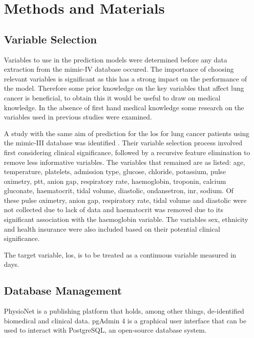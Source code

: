 \documentclass[11pt]{article}
\begin{document}
\newpage

\section{Methods and Materials}

\subsection{Variable Selection}
Variables to use in the prediction models were determined before any data extraction from the \gls{mimic}-IV database occured. The importance of choosing relevant variables is significant as this has a strong impact on the performance of the model. Therefore some prior knowledge on the key variables that affect lung cancer is beneficial, to obtain this it would be useful to draw on medical knowledge. In the absence of first hand medical knowledge some research on the variables used in previous studies were examined.  

A study with the same aim of prediction for the \gls{los} for lung cancer patients using the \gls{mimic}-III database was identified \cite{Alsinglawi123}. Their variable selection process involved first considering clinical significance, followed by a recursive feature elimination to remove less informative variables. The variables that remained are as listed: age, temperature, platelets, admission type, glucose, chloride, potassium, pulse oximetry, \gls{ptt}, anion gap, respiratory rate, haemoglobin, troponin, calcium gluconate, haematocrit, tidal volume, diastolic, ondansetron, \gls{inr}, sodium. Of these pulse oximetry, anion gap, respiratory rate, tidal volume and diastolic were not collected due to lack of data and haematocrit was removed due to its significant association with the haemoglobin variable. The variables sex, ethnicity and health insurance were also included based on their potential clinical significance. 

The target variable, \gls{los}, is to be treated as a continuous variable measured in days.

\subsection{Database Management}
PhysioNet\cite{PhysioNet} is a publishing platform that holds, among other things, de-identified biomedical and clinical data. pgAdmin 4 is a graphical user interface that can be used to interact with PostgreSQL, an open-source database system\cite{pgAdmin4}.
\end{document}
